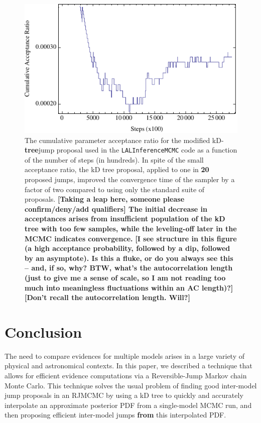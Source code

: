 \documentclass{iopart}
\newcommand{\ilya}[1]{{\color{red} \bf #1}}
\newcommand{\dan}[1]{{\color{magenta} \bf #1}}
\begin{document}
\begin{figure}
  \begin{center}
    \includegraphics[width=0.8\columnwidth]{linearlog3}
  \end{center}
  \caption{\label{fig:accratio} The cumulative parameter acceptance
    ratio for the modified kD-\dan{tree}jump proposal used in the
    \texttt{LALInferenceMCMC} code as a function of the number of
    steps (in hundreds). In spite of the small acceptance ratio, the
    kD tree proposal, applied to one in \dan{20} proposed jumps,
    improved the convergence time of the sampler by a factor of two
    compared to using only the standard suite of proposals. \dan{[Taking a leap here, someone please confirm/deny/add qualifiers] The initial decrease in acceptances arises from insufficient population of the kD tree with too few samples, while the leveling-off later in the MCMC indicates convergence.} \ilya{[I see structure in this figure (a high acceptance probability, followed by a dip, followed by an asymptote).  Is this a fluke, or do you always see this -- and, if so, why?  BTW, what's the autocorrelation length (just to give me a sense of scale, so I am not reading too much into meaningless fluctuations within an AC length)?]} \dan{[Don't recall the autocorrelation length. Will?]}}
\end{figure}

\section{Conclusion}
\label{sec:conclusion}

The need to compare evidences for multiple models arises in a large
variety of physical and astronomical contexts.  In this paper, we
described a technique that allows for efficient evidence
computations via a Reversible-Jump Markov chain Monte Carlo.  This
technique solves the usual problem of finding good inter-model jump
proposals in an RJMCMC by using a kD tree to quickly and accurately
interpolate an approximate posterior PDF from a single-model MCMC run,
and then proposing efficient inter-model
jumps \ilya{from} this interpolated PDF.
\end{document}
